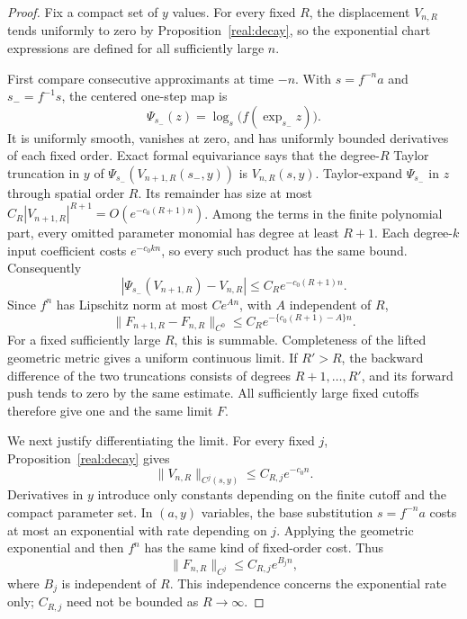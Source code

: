 \begin{proof}
Fix a compact set of $y$ values. For every fixed $R$, the
displacement $V_{n,R}$ tends uniformly to zero by
Proposition~\ref{real:decay}, so the exponential chart expressions
are defined for all sufficiently large $n$.

First compare consecutive approximants at time $-n$. With
$s=f^{-n}a$ and $s_-=f^{-1}s$, the centered one-step map is
\[
 \Psi_{s_-}(z)=\log_s\bigl(f(\exp_{s_-}z)\bigr).
\]
It is uniformly smooth, vanishes at zero, and has uniformly bounded
derivatives of each fixed order. Exact formal equivariance says
that the degree-$R$ Taylor truncation in $y$ of
$\Psi_{s_-}(V_{n+1,R}(s_-,y))$ is $V_{n,R}(s,y)$.
Taylor-expand $\Psi_{s_-}$ in $z$ through spatial order $R$.
Its remainder has size at most
$C_R|V_{n+1,R}|^{R+1}=O(e^{-c_0(R+1)n})$.
Among the terms in the finite polynomial part, every omitted
parameter monomial has degree at least $R+1$. Each degree-$k$
input coefficient costs $e^{-c_0kn}$, so every such product has
the same bound. Consequently
\[
 \left|\Psi_{s_-}(V_{n+1,R})-V_{n,R}\right|
       \le C_R e^{-c_0(R+1)n}.
\]
Since $f^n$ has Lipschitz norm at most $Ce^{An}$, with $A$
independent of $R$,
\begin{equation}\label{real:consecutive-czero}
 \|F_{n+1,R}-F_{n,R}\|_{C^0}
       \le C_R e^{-\{c_0(R+1)-A\}n}.
\end{equation}
For a fixed sufficiently large $R$, this is summable. Completeness
of the lifted geometric metric gives a uniform continuous limit.
If $R'>R$, the backward difference of the two truncations consists
of degrees $R+1,\ldots,R'$, and its forward push tends to zero by
the same estimate. All sufficiently large fixed cutoffs therefore
give one and the same limit $F$.

We next justify differentiating the limit. For every fixed $j$,
Proposition~\ref{real:decay} gives
\[
 \|V_{n,R}\|_{C^j(s,y)}\le C_{R,j}e^{-c_0n}.
\]
Derivatives in $y$ introduce only constants depending on the finite
cutoff and the compact parameter set. In $(a,y)$ variables, the
base substitution $s=f^{-n}a$ costs at most an exponential with
rate depending on $j$. Applying the geometric exponential and then
$f^n$ has the same kind of fixed-order cost. Thus
\begin{equation}\label{real:cutoff-independent-growth}
 \|F_{n,R}\|_{C^j}
      \le C_{R,j}e^{B_jn},
\end{equation}
where $B_j$ is independent of $R$. This independence concerns
the exponential rate only; $C_{R,j}$ need not be bounded as
$R\to\infty$.


\end{proof}
